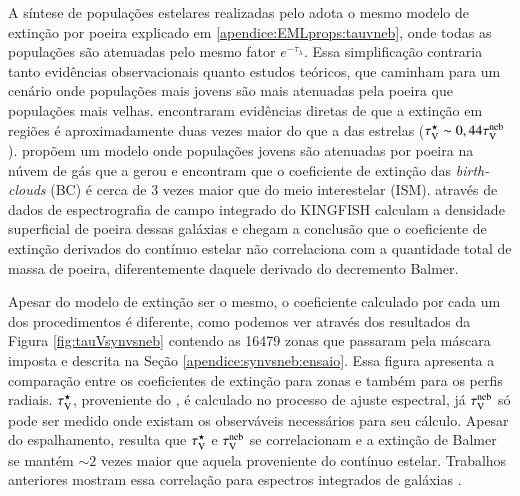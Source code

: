 A síntese de populações estelares realizadas pelo \starlight adota o mesmo modelo de extinção por poeira explicado em \ref{apendice:EMLprops:tauvneb}, onde todas as populações são atenuadas pelo mesmo fator $e^{-\tau_\lambda}$. Essa simplificação contraria tanto evidências observacionais quanto estudos teóricos, que caminham para um cenário onde populações mais jovens são mais atenuadas pela poeira que populações mais velhas. \citet{Calzetti.etal.1994a} encontraram evidências diretas de que a extinção em regiões \Hii é aproximadamente duas vezes maior do que a das estrelas ($\tau_{\mathrm{V}}^\star \sim 0,44 \tau_{\mathrm{V}}^{\mathrm{neb}}$). \citet{Charlot.Fall.2000a} propõem um modelo onde populações jovens são atenuadas por poeira na núvem de gás que a gerou e encontram que o coeficiente de extinção das {\em birth-clouds} (BC) é cerca de 3 vezes maior que  do meio interestelar (ISM). \citet{Kreckel.etal.2013a} através de dados de espectrografia de campo integrado do KINGFISH \citep{Kennicutt.etal.2011a} calculam a densidade superficial de poeira dessas galáxias e chegam a conclusão que o coeficiente de extinção derivados do contínuo estelar não correlaciona com a quantidade total de massa de poeira, diferentemente daquele derivado do decremento Balmer.

Apesar do modelo de extinção ser o mesmo, o coeficiente calculado por cada um dos procedimentos é diferente, como podemos ver através dos resultados da Figura \ref{fig:tauVsynvsneb} contendo as 16479 zonas que passaram pela máscara imposta e descrita na Seção \ref{apendice:synvsneb:ensaio}. Essa figura apresenta a comparação entre os coeficientes de extinção para zonas e também para os perfis radiais. $\tau_{\mathrm{V}}^\star$, proveniente do \starlight, é calculado no processo de ajuste espectral, já $\tau_{\mathrm{V}}^{\mathrm{neb}}$ só pode ser medido onde existam os observáveis necessários para seu cálculo. Apesar do espalhamento, resulta que $\tau_{\mathrm{V}}^\star$ e $\tau_{\mathrm{V}}^{\mathrm{neb}}$ se correlacionam e a extinção de Balmer se mantém $\sim 2$ vezes maior que aquela proveniente do contínuo estelar. Trabalhos anteriores mostram essa correlação para espectros integrados de galáxias \citep{Stasinska.etal.2004a, CidFernandes.etal.2005a, Asari.etal.2007a}.

